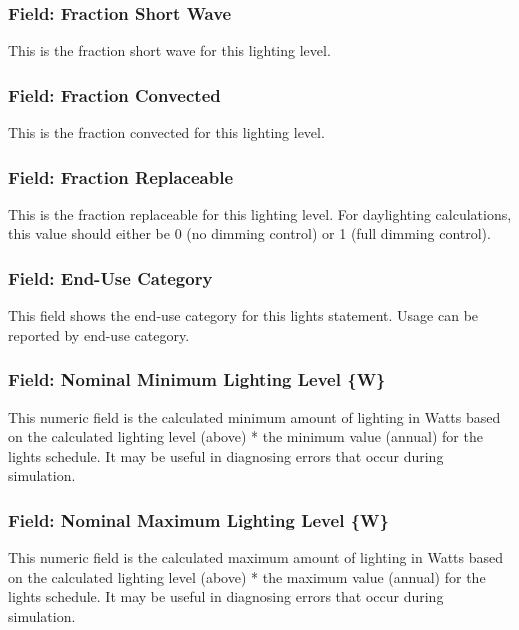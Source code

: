 \subsubsection{Field: Fraction Short Wave}\label{field-fraction-short-wave}

This is the fraction short wave for this lighting level.

\subsubsection{Field: Fraction Convected}\label{field-fraction-convected-1}

This is the fraction convected for this lighting level.

\subsubsection{Field: Fraction Replaceable}\label{field-fraction-replaceable}

This is the fraction replaceable for this lighting level. For daylighting calculations, this value should either be 0 (no dimming control) or 1 (full dimming control).

\subsubsection{Field: End-Use Category}\label{field-end-use-category}

This field shows the end-use category for this lights statement. Usage can be reported by end-use category.

\subsubsection{Field: Nominal Minimum Lighting Level \{W\}}\label{field-nominal-minimum-lighting-level-w}

This numeric field is the calculated minimum amount of lighting in Watts based on the calculated lighting level (above) * the minimum value (annual) for the lights schedule. It may be useful in diagnosing errors that occur during simulation.

\subsubsection{Field: Nominal Maximum Lighting Level \{W\}}\label{field-nominal-maximum-lighting-level-w}

This numeric field is the calculated maximum amount of lighting in Watts based on the calculated lighting level (above) * the maximum value (annual) for the lights schedule. It may be useful in diagnosing errors that occur during simulation.

